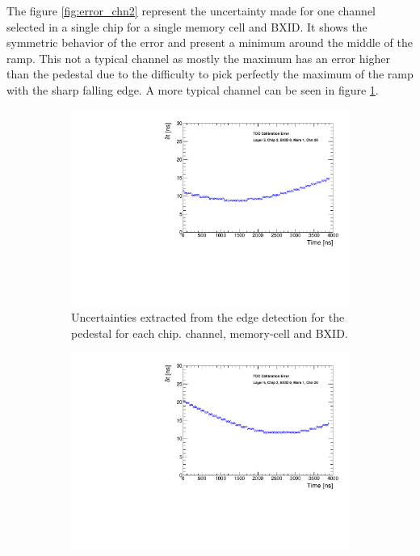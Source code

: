 The figure \ref{fig:error_chn2} represent the uncertainty made for one channel selected in a single chip for a single memory cell and BXID. It shows the symmetric behavior of the error and present a minimum around the middle of the ramp. This not a typical channel as mostly the maximum has an error higher than the pedestal due to the difficulty to pick perfectly the maximum of the ramp with the sharp falling edge. A more typical channel can be seen in figure \ref{fig:error_chn}.

\begin{figure}[htbp!]
	\begin{subfigure}[t]{0.49\textwidth}
		\centering
		\includegraphics[width=1\linewidth]{../Thesis_Plots/Timing/Muons/Plots/TimeErrorEstimation_Layer3.pdf}
		\caption{Uncertainties extracted from the edge detection for the pedestal for each chip. channel, memory-cell and BXID.} \label{fig:error_chn}
	\end{subfigure}
	\hfill
	\begin{subfigure}[t]{0.49\textwidth}
		\centering
		\includegraphics[width=1\linewidth]{../Thesis_Plots/Timing/Muons/Plots/TimeErrorEstimation_Layer5.pdf}

\end{subfigure}
\end{figure}
